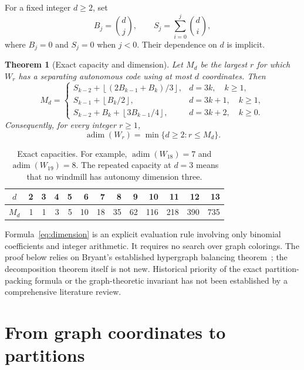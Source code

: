 \documentclass[11pt]{article}
\newtheorem{theorem}{Theorem}[section]
\theoremstyle{definition}
\newcommand{\adim}{\operatorname{adim}}
\numberwithin{equation}{section}
\begin{document}
For a fixed integer $d\geq2$, set
\[
 B_j=\binom dj,\qquad S_j=\sum_{i=0}^j\binom di,
\]
where $B_j=0$ and $S_j=0$ when $j<0$. Their dependence on $d$ is implicit.

\begin{theorem}[Exact capacity and dimension]\label{thm:main}
Let $M_d$ be the largest $r$ for which $W_r$ has a separating autonomous
code using at most $d$ coordinates. Then
\begin{equation}\label{eq:capacity}
 M_d=
 \begin{cases}
 S_{k-2}+\left\lfloor(2B_{k-1}+B_k)/3\right\rfloor,
     &d=3k,\quad k\geq1,\\[2pt]
 S_{k-1}+\left\lfloor B_k/2\right\rfloor,
     &d=3k+1,\quad k\geq1,\\[2pt]
 S_{k-2}+B_k+\left\lfloor3B_{k-1}/4\right\rfloor,
     &d=3k+2,\quad k\geq0.
 \end{cases}
\end{equation}
Consequently, for every integer $r\geq1$,
\begin{equation}\label{eq:dimension}
 \boxed{\adim(W_r)=\min\{d\geq2:r\leq M_d\}.}
\end{equation}
\end{theorem}

\begin{table}[ht]
\centering
\begin{tabular}{c|rrrrrrrrrrrr}
\toprule
$d$&2&3&4&5&6&7&8&9&10&11&12&13\\
\midrule
$M_d$&1&1&3&5&10&18&35&62&116&218&390&735\\
\bottomrule
\end{tabular}
\caption{Exact capacities. For example, $\adim(W_{18})=7$ and
$\adim(W_{19})=8$. The repeated capacity at $d=3$ means that no windmill
has autonomy dimension three.}
\end{table}

Formula~\eqref{eq:dimension} is an explicit evaluation rule involving only
binomial coefficients and integer arithmetic. It requires no search
over graph colorings. The proof below relies on Bryant's established
hypergraph balancing theorem~\cite{Bryant}; the decomposition theorem
itself is not new. Historical priority of the exact partition-packing
formula or the graph-theoretic invariant has not been established by a
comprehensive literature review.

\section{From graph coordinates to partitions}
\end{document}
